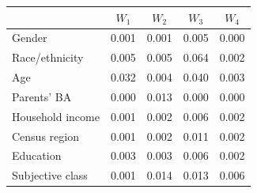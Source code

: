 \begin{tabular}{lcccc}
\toprule
 & $W_1$ & $W_2$ & $W_3$ & $W_4$ \\
\midrule
Gender & 0.001 & 0.001 & 0.005 & 0.000 \\
Race/ethnicity & 0.005 & 0.005 & 0.064 & 0.002 \\
Age & 0.032 & 0.004 & 0.040 & 0.003 \\
Parents' BA & 0.000 & 0.013 & 0.000 & 0.000 \\
Household income & 0.001 & 0.002 & 0.006 & 0.002 \\
Census region & 0.001 & 0.002 & 0.011 & 0.002 \\
Education & 0.003 & 0.003 & 0.006 & 0.002 \\
Subjective class & 0.001 & 0.014 & 0.013 & 0.006 \\
\bottomrule
\end{tabular}

